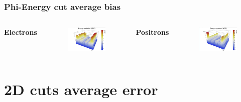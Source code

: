 \documentclass{beamer}
\begin{document}
		\begin{frame}
			\frametitle{Phi-Energy cut average bias}
			\begin{columns}
				\centering
				\Large \textbf{Electrons}
				\begin{figure}
					\centering
					\includegraphics[width = 0.95 \linewidth]{images/c_e_phi_energy.png}
				\end{figure}
				\centering
				\Large \textbf{Positrons}
				\begin{figure}
					\centering
					\includegraphics[width = 0.95 \linewidth]{images/c_p_phi_energy.png}
				\end{figure}
			\end{columns}
		\end{frame}
	
	\section{2D cuts average error}
	
\end{document}
